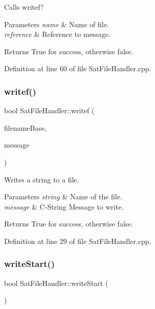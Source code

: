 Calls writef? 


\begin{DoxyParams}{Parameters}
{\em name} & Name of file. \\
\hline
{\em reference} & Reference to message. \\
\hline
\end{DoxyParams}
\begin{DoxyReturn}{Returns}
True for success, otherwise false. 
\end{DoxyReturn}


Definition at line 60 of file Sat\+File\+Handler.\+cpp.

\mbox{\label{class_sat_file_handler_a355361c4ec4692c5b533740121976eb2}} 
\subsubsection{\texorpdfstring{writef()}{writef()}}
{\footnotesize\ttfamily bool Sat\+File\+Handler\+::writef (\begin{DoxyParamCaption}\item[{std\+::string}]{filename\+Base,  }\item[{const char $\ast$}]{message }\end{DoxyParamCaption})}



Writes a string to a file. 


\begin{DoxyParams}{Parameters}
{\em string} & Name of the file. \\
\hline
{\em message} & C-\/\+String Message to write. \\
\hline
\end{DoxyParams}
\begin{DoxyReturn}{Returns}
True for success, otherwise false. 
\end{DoxyReturn}


Definition at line 29 of file Sat\+File\+Handler.\+cpp.

\mbox{\label{class_sat_file_handler_a458d6cf20f9384c4ef1c0ce3f57d1ab1}} 
\subsubsection{\texorpdfstring{writeStart()}{writeStart()}}
{\footnotesize\ttfamily bool Sat\+File\+Handler\+::write\+Start (\begin{DoxyParamCaption}{ }\end{DoxyParamCaption})}



